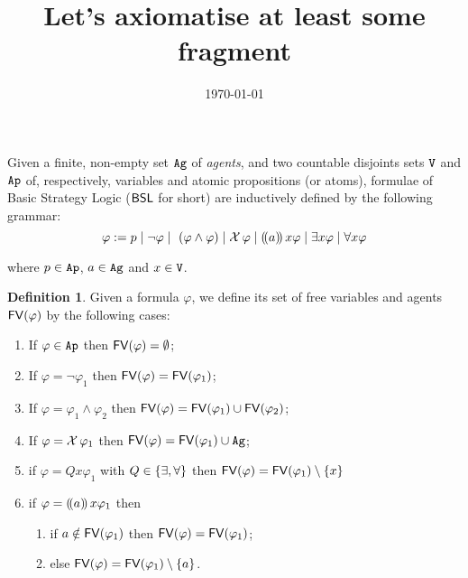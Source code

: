 \documentclass{article}
\title{Let's axiomatise at least some fragment}
\date{\today}
\theoremstyle{definition}
\newtheorem{definition}{Definition}[section]
\begin{document}
\maketitle

Given a finite, non-empty set $\texttt{Ag}$ of \emph{agents}, and two countable disjoints sets $\texttt{V}$ and $\texttt{Ap}$ of, respectively, variables and atomic propositions (or atoms), formulae of Basic Strategy Logic ($\mathsf{BSL}$ for short) are inductively defined by the following grammar: 
$$\varphi := p \mid \neg \varphi \mid \ (\varphi \land \varphi) \mid \mathcal{X}\, \varphi \mid (\!( a )\!)\, x \varphi \mid \exists x \varphi \mid \forall x \varphi $$

\noindent where $p\in \texttt{Ap}$, $a\in \texttt{Ag}$ and $x\in \texttt{V}$. 


\begin{definition}
      Given a formula $\varphi$, we define its set of free variables  and agents $\mathsf{FV}(\varphi)$ by the following cases: 

    \begin{enumerate}
        
        \item If $\varphi\in \texttt{Ap}$ then $\mathsf{FV}(\varphi)=\emptyset$; 
        \item If $\varphi=\neg \varphi_1$ then $\mathsf{FV}(\varphi)=\mathsf{FV}(\varphi_1)$; 
        \item If $\varphi=\varphi_1 \land \varphi_2$ then $\mathsf{FV}(\varphi)=\mathsf{FV}(\varphi_1)\cup \mathsf{FV}(\varphi_2)$; 
        \item If $\varphi=\mathcal{X}\, \varphi_1$ then $\mathsf{FV}(\varphi)=\mathsf{FV}(\varphi_1)\cup \texttt{Ag}$;
        
        \item if $\varphi= Q x \varphi_1$ with $Q\in \{\exists,\forall\}$ then $\mathsf{FV}(\varphi)=\mathsf{FV}(\varphi_1)\setminus \{x\}$
        \item if $\varphi=(\!( a )\!)\,{x}\varphi_1$ then 
        \begin{enumerate}
            \item if $a\notin \mathsf{FV}(\varphi_1)$ then $\mathsf{FV}(\varphi)=\mathsf{FV}(\varphi_1)$;
            \item else $\mathsf{FV}(\varphi)=\mathsf{FV}(\varphi_1)\setminus\{a\}$.
        \end{enumerate}
    \end{enumerate}
\end{definition}
\end{document}
